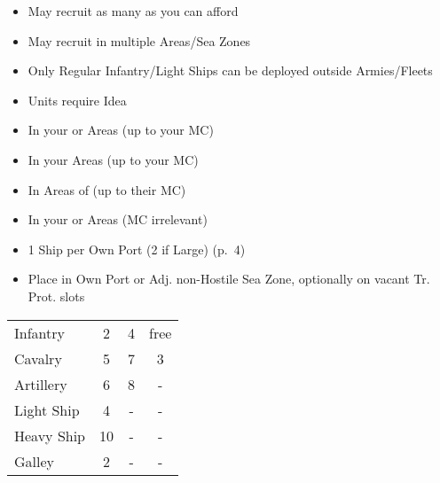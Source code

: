 \documentclass[10pt]{article}
\begin{document}
\begin{itemize}
	\item May recruit as many as you can afford
	\item May recruit in multiple Areas/Sea Zones
	\item Only Regular Infantry/Light Ships can be deployed outside Armies/Fleets
	\item {} Units require  Idea 
\end{itemize}
\begin{itemize}
	\item In your or \vassal Areas (up to your MC)
\end{itemize}
\begin{itemize}
	\item In your Areas (up to your MC)
	\item In Areas of \activeallies (up to their MC)
\end{itemize}
\begin{itemize}
	\item In your or \vassal Areas (MC irrelevant)
\end{itemize}
\begin{itemize}
	\item 1 Ship per Own Port (2 if Large) (p.~4)
	\item {}Place in Own Port or Adj. non-Hostile Sea Zone, optionally on vacant Tr. Prot. slots
\end{itemize}
\begin{tabularx}{\columnwidth}{ | l | C | C | C | }
	\hline
	\null &   &   &   \\ \hline
	Infantry &  2\ducats &  4\ducats &  free \\ \hline
	Cavalry &  5\ducats &  7\ducats &  3\ducats \\ \hline
	Artillery &  6\ducats &  8\ducats & - \\ \hline
	Light Ship & 4\ducats & - & - \\ \hline
	Heavy Ship & 10\ducats & - & - \\ \hline
	Galley & 2\ducats & - & - \\ \hline
\end{tabularx}
\end{document}

